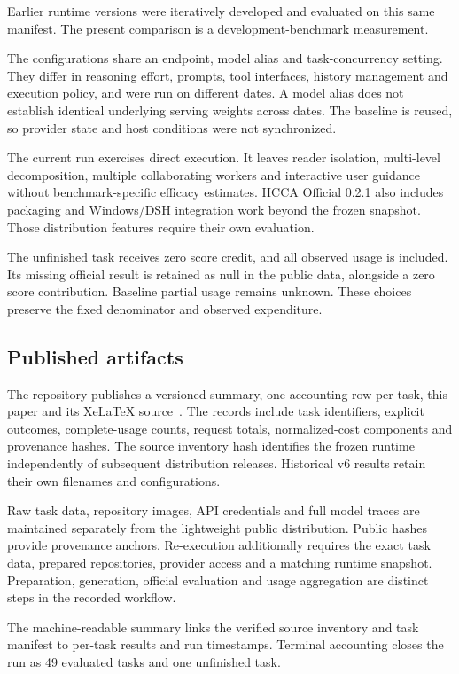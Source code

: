 \documentclass[10pt,a4paper]{article}
\begin{document}
Earlier runtime versions were iteratively developed and evaluated on this
same manifest. The present comparison is a development-benchmark measurement.

The configurations share an endpoint, model alias and task-concurrency setting.
They differ in reasoning effort, prompts, tool interfaces, history management
and execution policy, and were run on different dates. A model alias does not
establish identical underlying serving weights across dates. The baseline is
reused, so provider state and host conditions were not synchronized.

The current run exercises direct execution. It leaves reader isolation,
multi-level decomposition, multiple collaborating workers and interactive user
guidance without benchmark-specific efficacy estimates. HCCA Official 0.2.1
also includes packaging and Windows/DSH integration work beyond the frozen
snapshot. Those distribution features require their own evaluation.

The unfinished task receives zero score credit, and all observed usage is
included. Its
missing official result is retained as null in the public data, alongside a
zero score contribution. Baseline partial usage remains unknown. These choices
preserve the fixed denominator and observed expenditure.

\subsection{Published artifacts}

The repository publishes a versioned summary, one accounting row per task,
this paper and its XeLaTeX source~\cite{artifacts}. The records include task
identifiers, explicit outcomes, complete-usage counts, request totals,
normalized-cost components and provenance hashes. The source inventory hash
identifies the frozen runtime independently of subsequent distribution
releases. Historical v6 results retain their own filenames and configurations.

Raw task data, repository images, API credentials and full model traces are
maintained separately from the lightweight public distribution. Public hashes
provide provenance anchors. Re-execution additionally requires the exact task
data, prepared repositories, provider access and a matching runtime snapshot.
Preparation, generation, official evaluation and usage aggregation are distinct
steps in the recorded workflow.

The machine-readable summary links the verified source inventory and task
manifest to per-task results and run timestamps. Terminal accounting closes
the run as 49 evaluated tasks and one unfinished task.
\end{document}
